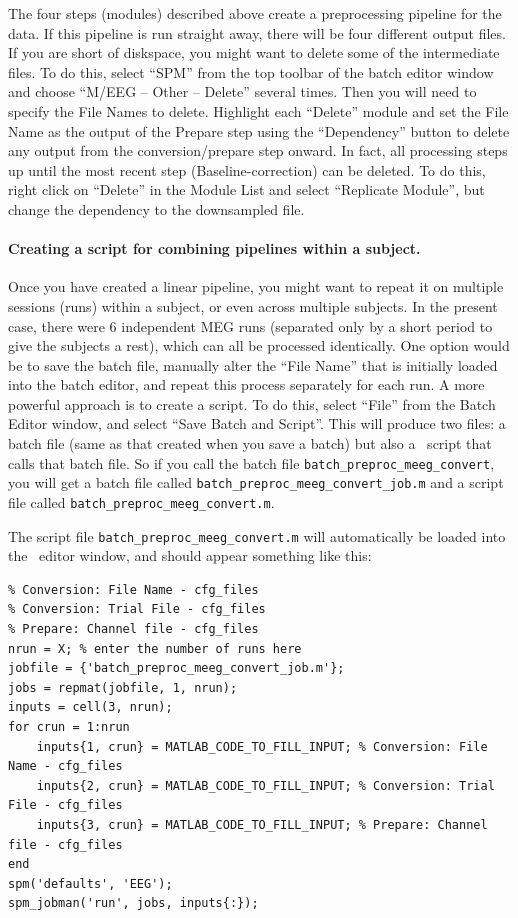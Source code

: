 The four steps (modules) described above create a preprocessing pipeline for the data. If this pipeline is run straight away, there will be four different output files. If you are short of diskspace, you might want to delete some of the intermediate files. To do this, select ``SPM'' from the top toolbar of the batch editor window and choose ``M/EEG -- Other -- Delete'' several times. Then you will need to specify the File Names to delete. Highlight each ``Delete'' module and set the File Name as the output of the Prepare step using the ``Dependency'' button to delete any output from the conversion/prepare step onward. In fact, all processing steps up until the most recent step (Baseline-correction) can be deleted. To do this, right click on ``Delete'' in the Module List and select ``Replicate Module'', but change the dependency to the downsampled file. 

\paragraph{Creating a script for combining pipelines within a subject.}

Once you have created a linear pipeline, you might want to repeat it on multiple sessions (runs) within a subject, or even across multiple subjects. In the present case, there were 6 independent MEG runs (separated only by a short period to give the subjects a rest), which can all be processed identically. One option would be to save the batch file, manually alter the ``File Name'' that is initially loaded into the batch editor, and repeat this process separately for each run. A more powerful approach is to create a script. To do this, select ``File'' from the Batch Editor window, and select ``Save Batch and Script''. This will produce two files: a batch file (same as that created when you save a batch) but also a \matlab\ script that calls that batch file. So if you call the batch file \texttt{batch\_preproc\_meeg\_convert}, you will get a batch file called \texttt{batch\_preproc\_meeg\_convert\_job.m} and a script file called \texttt{batch\_preproc\_meeg\_convert.m}.
 
The script file \texttt{batch\_preproc\_meeg\_convert.m} will automatically be loaded into the \matlab\ editor window, and should appear something like this:


\begin{lstlisting}[style=Matlab-editor,basicstyle=\mlttfamily\footnotesize]
% List of open inputs
% Conversion: File Name - cfg_files
% Conversion: Trial File - cfg_files
% Prepare: Channel file - cfg_files
nrun = X; % enter the number of runs here
jobfile = {'batch_preproc_meeg_convert_job.m'};
jobs = repmat(jobfile, 1, nrun);
inputs = cell(3, nrun);
for crun = 1:nrun
    inputs{1, crun} = MATLAB_CODE_TO_FILL_INPUT; % Conversion: File Name - cfg_files
    inputs{2, crun} = MATLAB_CODE_TO_FILL_INPUT; % Conversion: Trial File - cfg_files
    inputs{3, crun} = MATLAB_CODE_TO_FILL_INPUT; % Prepare: Channel file - cfg_files
end
spm('defaults', 'EEG');
spm_jobman('run', jobs, inputs{:}); 
\end{lstlisting}

